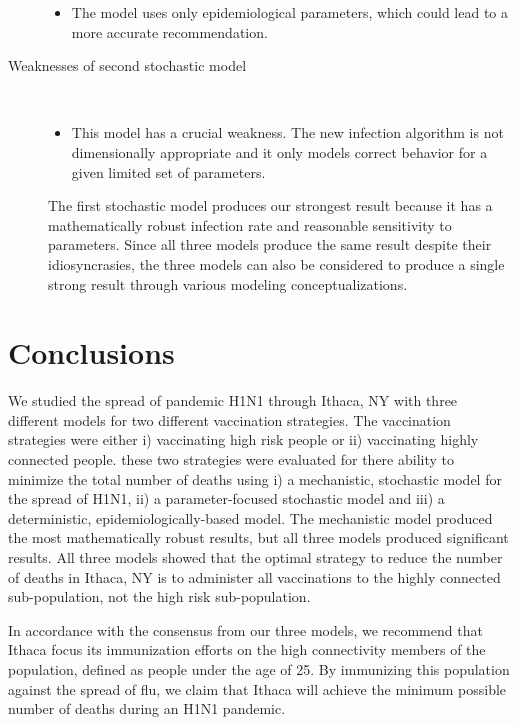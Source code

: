 \documentclass[titlepage]{article}
\begin{document}
\begin{description}
\begin{itemize}
\item The model uses only epidemiological parameters, which could lead to a more accurate recommendation.
\end{itemize}

 

\item[Weaknesses of second stochastic model]\hfill \\
\begin{itemize}

\item This model has a crucial weakness. The new infection algorithm is not dimensionally appropriate and it only models correct behavior for a given limited set of parameters.
\end{itemize}

The first stochastic model produces our strongest result because it has a mathematically robust infection rate and reasonable sensitivity to parameters. Since all three models produce the same result despite their idiosyncrasies, the three models can also be considered to produce a single strong result through various modeling conceptualizations.

\end{description}

\section{Conclusions}
We studied the spread of pandemic H1N1 through Ithaca, NY with three different models for two different vaccination strategies. The vaccination strategies were either i) vaccinating high risk people or ii) vaccinating highly connected people. these two strategies were evaluated for there ability to minimize the total number of deaths using i) a mechanistic, stochastic model for the spread of H1N1, ii) a parameter-focused stochastic model and iii) a deterministic, epidemiologically-based model. The mechanistic model produced the most mathematically robust results, but all three models produced significant results. All three models showed that the optimal strategy to reduce the number of deaths in Ithaca, NY is to administer all vaccinations to the highly connected sub-population, not the high risk sub-population.

In accordance with the consensus from our three models, we recommend that Ithaca focus its immunization efforts on the high connectivity members of the population, defined as people under the age of 25. By immunizing this population against the spread of flu, we claim that Ithaca will achieve the minimum possible number of deaths during an H1N1 pandemic.
\end{document}
